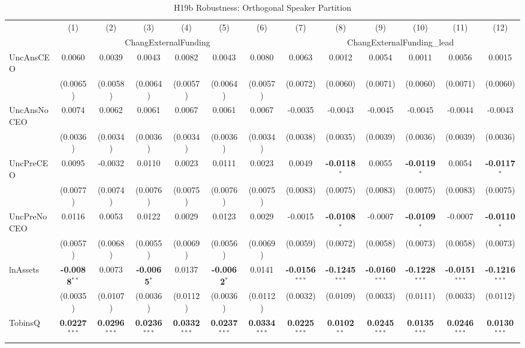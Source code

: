\documentclass[11pt,a4paper]{article}
\begin{document}
\begin{table}[htbp]
\centering
\caption{H19b Robustness: Orthogonal Speaker Partition}
\label{tab:h19b_robust}
\scriptsize
\begin{tabular}{lcccccccccccc}
\toprule
 & (1) & (2) & (3) & (4) & (5) & (6) & (7) & (8) & (9) & (10) & (11) & (12) \\
 & \multicolumn{6}{c}{ChangExternalFunding} & \multicolumn{6}{c}{ChangExternalFunding\_lead} \\
\cmidrule(lr){2-7} \cmidrule(lr){8-13}
\midrule
UncAnsCEO & 0.0060 & 0.0039 & 0.0043 & 0.0082 & 0.0043 & 0.0080 & 0.0063 & 0.0012 & 0.0054 & 0.0011 & 0.0056 & 0.0015 \\
 & (0.0065) & (0.0058) & (0.0064) & (0.0057) & (0.0064) & (0.0057) & (0.0072) & (0.0060) & (0.0071) & (0.0060) & (0.0071) & (0.0060) \\
UncAnsNoCEO & 0.0074 & 0.0062 & 0.0061 & 0.0067 & 0.0061 & 0.0067 & -0.0035 & -0.0043 & -0.0045 & -0.0045 & -0.0044 & -0.0043 \\
 & (0.0036) & (0.0034) & (0.0036) & (0.0034) & (0.0036) & (0.0034) & (0.0038) & (0.0035) & (0.0039) & (0.0036) & (0.0039) & (0.0036) \\
UncPreCEO & 0.0095 & -0.0032 & 0.0110 & 0.0023 & 0.0111 & 0.0023 & 0.0049 & \textbf{-0.0118}$^{*}$ & 0.0055 & \textbf{-0.0119}$^{*}$ & 0.0054 & \textbf{-0.0117}$^{*}$ \\
 & (0.0077) & (0.0074) & (0.0076) & (0.0075) & (0.0076) & (0.0075) & (0.0083) & (0.0075) & (0.0083) & (0.0075) & (0.0083) & (0.0075) \\
UncPreNoCEO & 0.0116 & 0.0053 & 0.0122 & 0.0029 & 0.0123 & 0.0029 & -0.0015 & \textbf{-0.0108}$^{*}$ & -0.0007 & \textbf{-0.0109}$^{*}$ & -0.0007 & \textbf{-0.0110}$^{*}$ \\
 & (0.0057) & (0.0068) & (0.0055) & (0.0069) & (0.0056) & (0.0069) & (0.0059) & (0.0072) & (0.0058) & (0.0073) & (0.0058) & (0.0073) \\
\midrule
lnAssets & \textbf{-0.0088}$^{**}$ & 0.0073 & \textbf{-0.0065}$^{*}$ & 0.0137 & \textbf{-0.0062}$^{*}$ & 0.0141 & \textbf{-0.0156}$^{***}$ & \textbf{-0.1245}$^{***}$ & \textbf{-0.0160}$^{***}$ & \textbf{-0.1228}$^{***}$ & \textbf{-0.0151}$^{***}$ & \textbf{-0.1216}$^{***}$ \\
 & (0.0035) & (0.0107) & (0.0036) & (0.0112) & (0.0036) & (0.0112) & (0.0032) & (0.0109) & (0.0033) & (0.0111) & (0.0033) & (0.0112) \\
TobinsQ & \textbf{0.0227}$^{***}$ & \textbf{0.0296}$^{***}$ & \textbf{0.0236}$^{***}$ & \textbf{0.0332}$^{***}$ & \textbf{0.0237}$^{***}$ & \textbf{0.0334}$^{***}$ & \textbf{0.0225}$^{***}$ & \textbf{0.0102}$^{**}$ & \textbf{0.0245}$^{***}$ & \textbf{0.0135}$^{***}$ & \textbf{0.0246}$^{***}$ & \textbf{0.0130}$^{***}$ \\

\end{tabular}
\end{table}
\end{document}
